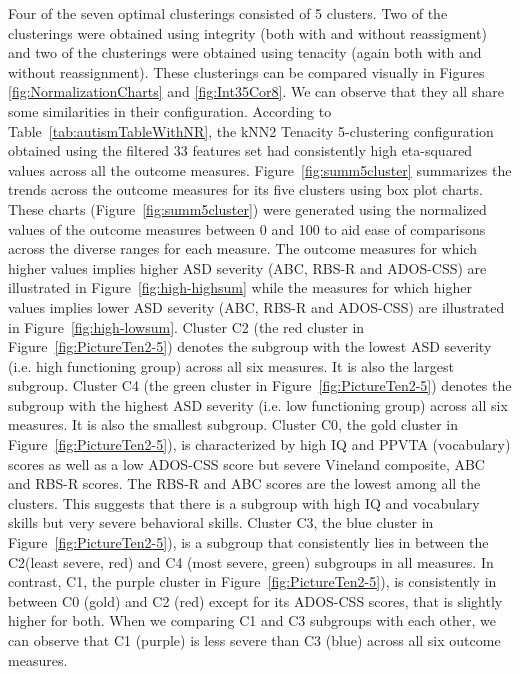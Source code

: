 \documentclass{bmcart}
\begin{document}
Four of the seven optimal clusterings consisted of 5 clusters. Two of the clusterings were obtained using integrity (both with and without reassigment) and two of the clusterings were obtained using tenacity (again both with and without reassignment). These clusterings can be compared visually in Figures \ref{fig:NormalizationCharts} and \ref{fig:Int35Cor8}.  We can observe that they all share some similarities in their configuration.  
According to Table~\ref{tab:autismTableWithNR}, the kNN2 Tenacity 5-clustering configuration obtained using the filtered 33 features set had consistently high eta-squared values across all the outcome measures. Figure~\ref{fig:summ5cluster} summarizes the trends across the outcome measures for its five clusters using box plot charts. These charts (Figure~\ref{fig:summ5cluster}) were generated using the normalized values of the outcome measures between 0 and 100 to aid ease of comparisons across the diverse ranges for each measure. The outcome measures for which higher values implies higher ASD severity (ABC, RBS-R and ADOS-CSS) are illustrated in Figure~\ref{fig:high-highsum} while the measures for which higher values implies lower ASD severity (ABC, RBS-R and ADOS-CSS) are illustrated in Figure~\ref{fig:high-lowsum}.
Cluster C2 (the red cluster in Figure~\ref{fig:PictureTen2-5}) denotes the subgroup with the lowest ASD severity (i.e. high functioning group) across all six measures. It is also the largest subgroup.
Cluster C4 (the green cluster in Figure~\ref{fig:PictureTen2-5}) denotes the subgroup with the highest ASD severity (i.e. low functioning group) across all six measures. It is also the smallest subgroup.  
Cluster C0, the gold cluster in Figure~\ref{fig:PictureTen2-5}), is characterized by high IQ and PPVTA (vocabulary) scores as well as a low ADOS-CSS score but severe Vineland composite, ABC and RBS-R scores. The RBS-R and ABC scores are the lowest among all the clusters. This suggests that there is a subgroup with high IQ and vocabulary skills but very severe behavioral skills.
Cluster C3, the blue cluster in Figure~\ref{fig:PictureTen2-5}), is a subgroup that consistently lies in between the C2(least severe, red) and C4 (most severe, green) subgroups in all measures. In contrast, C1, the purple cluster in Figure~\ref{fig:PictureTen2-5}), is consistently in between C0 (gold) and C2 (red) except for its ADOS-CSS scores, that is slightly higher for both. 
When we comparing C1 and C3 subgroups with each other, we can observe that C1 (purple) is less severe than C3 (blue) across all six outcome measures. 
\end{document}
